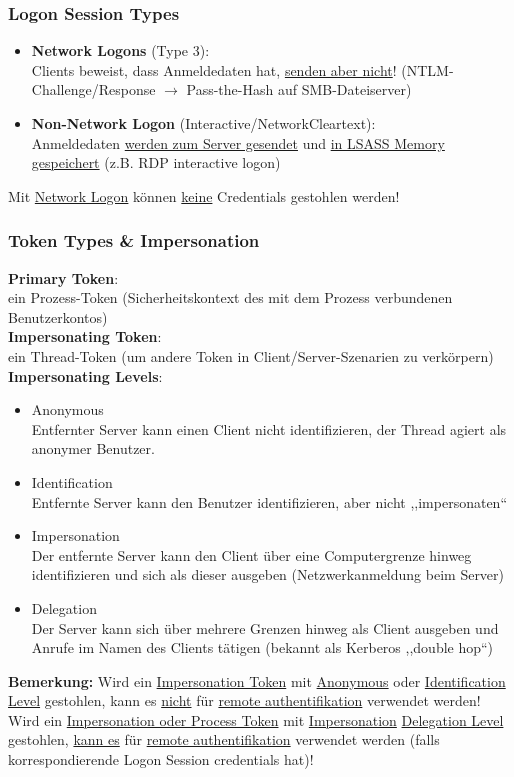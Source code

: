 \subsubsection{Logon Session Types}
\begin{itemize}
    \item \textbf{Network Logons} (Type 3):\\
    Clients beweist, dass Anmeldedaten hat, \underline{senden aber nicht}! (NTLM-Challenge/Response $\rightarrow$ Pass-the-Hash auf SMB-Dateiserver)
    \item \textbf{Non-Network Logon} (Interactive/NetworkCleartext):\\
    Anmeldedaten \underline{werden zum Server gesendet} und \underline{in LSASS Memory} \underline{gespeichert} (z.B. RDP interactive logon)
\end{itemize}
Mit \underline{Network Logon} können \underline{keine} Credentials gestohlen werden!

\subsubsection{Token Types \& Impersonation}
\textbf{Primary Token}:\\
ein Prozess-Token (Sicherheitskontext des mit dem Prozess verbundenen Benutzerkontos)\\
\textbf{Impersonating Token}:\\
ein Thread-Token (um andere Token in Client/Server-Szenarien zu verkörpern)\\
\textbf{Impersonating Levels}:
\begin{itemize}
    \item Anonymous\\
    Entfernter Server kann einen Client nicht identifizieren, der Thread agiert als anonymer Benutzer.
    \item Identification\\
    Entfernte Server kann den Benutzer identifizieren, aber nicht ,,impersonaten``
    \item Impersonation\\
    Der entfernte Server kann den Client über eine Computergrenze hinweg identifizieren und sich als dieser ausgeben (Netzwerkanmeldung beim Server)
    \item Delegation\\
    Der Server kann sich über mehrere Grenzen hinweg als Client ausgeben und Anrufe im Namen des Clients tätigen (bekannt als Kerberos ,,double hop``)
\end{itemize}
\textbf{Bemerkung:}
Wird ein \underline{Impersonation Token} mit \underline{Anonymous} oder \underline{Identification Level} gestohlen, kann es \underline{nicht} für \underline{remote authentifikation} verwendet werden! \\
Wird ein \underline{Impersonation oder Process Token} mit \underline{Impersonation} \underline{Delegation Level} gestohlen, \underline{kann es} für \underline{remote authentifikation} verwendet werden (falls korrespondierende Logon Session credentials hat)!

